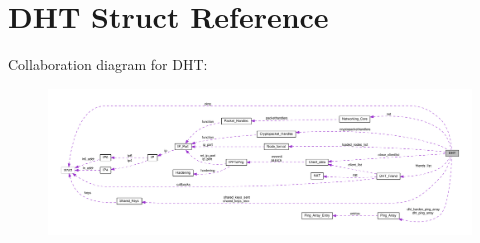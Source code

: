\hypertarget{struct_d_h_t}{\section{D\+H\+T Struct Reference}
\label{struct_d_h_t}
}


Collaboration diagram for D\+H\+T\+:\nopagebreak
\begin{figure}[H]
\begin{center}
\leavevmode
\includegraphics[width=350pt]{struct_d_h_t__coll__graph}
\end{center}
\end{figure}
